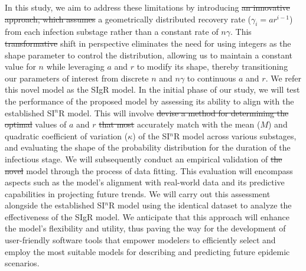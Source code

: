 \documentclass[12pt]{article}
\providecommand{\DIFadd}[1]{{\protect\color{blue}\uwave{#1}}} %
\providecommand{\DIFdel}[1]{{\protect\color{red}\sout{#1}}}                      %
\providecommand{\DIFaddbegin}{} %
\providecommand{\DIFaddend}{} %
\providecommand{\DIFdelbegin}{} %
\providecommand{\DIFdelend}{} %
\begin{document}
\DIFaddend In this study, we aim to address these limitations by introducing \DIFdelbegin \DIFdel{an innovative approach, which assumes }\DIFdelend a geometrically distributed recovery rate ($\gamma_i = ar^{i-1}$) from each infection substage rather than a constant rate of $n\gamma$.
This \DIFdelbegin \DIFdel{transformative }\DIFdelend shift in perspective eliminates the need for using integers as the shape parameter to control the distribution, allowing us to maintain a constant value for $n$ while leveraging $a$ and $r$ to modify its shape, thereby transitioning our parameters of interest from discrete $n$ and $n\gamma$ to continuous $a$ and $r$.
We refer this novel model as the SIgR model. In the initial phase of our study, we will test the performance of the proposed model by assessing its ability to align with the established SI$^n$R model.
This will involve \DIFdelbegin \DIFdel{devise a method for determining the optimal }\DIFdelend \DIFaddbegin \DIFadd{devising a method to choose }\DIFaddend values of $a$ and $r$ \DIFdelbegin \DIFdel{that most }\DIFdelend \DIFaddbegin \DIFadd{to }\DIFaddend accurately match with the mean ($M$) and quadratic coefficient of variation ($\kappa$) of the SI$^n$R model across various substages, and evaluating the shape of the probability distribution for the duration of the infectious stage. We will subsequently conduct an empirical validation of \DIFdelbegin \DIFdel{the novel }\DIFdelend \DIFaddbegin \DIFadd{our }\DIFaddend model through the process of data fitting. This evaluation will encompass aspects such as the model's alignment with real-world data and its predictive capabilities in projecting future trends. We will carry out this assessment alongside the established SI$^n$R model using the identical dataset to analyze the effectiveness of the SIgR model. We anticipate that this approach will enhance the model's flexibility and utility, thus paving the way for the development of user-friendly software tools that empower modelers to efficiently select and employ the most suitable models for describing and predicting future epidemic scenarios.
\DIFdelbegin %
\DIFdelend %
\end{document}
